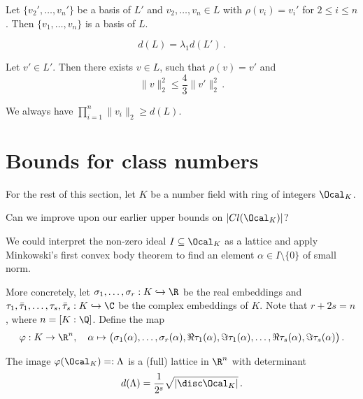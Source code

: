 \begin{lem}
	Let \( \{v_2', \dotsc, v_n'\} \) be a basis of \( L' \) and \( v_2, \dotsc, v_n \in L \) with \( \rho(v_i) = v_i' \) for \( 2 \leq i \leq n \).
	Then \( \{v_1, \dotsc, v_n\} \) is a basis of \( L \).
\end{lem}

\begin{lem}
	\[ d(L) = \lambda_1 d(L') \,. \]
\end{lem}

\begin{lem}
	Let \( v' \in L' \).
	Then there exists \( v \in L \), such that \( \rho(v) = v' \) and
	\[ \|v\|_2^2 \leq \frac{4}{3} \|v'\|_2^2 \,. \]
\end{lem}

\begin{rem*}
	We always have \( \prod_{i=1}^{n} \|v_i\|_2 \geq d(L) \).
\end{rem*}


\section{Bounds for class numbers}

For the rest of this section, let \( K \) be a number field with ring of integers \( \Ocal_K \).

\begin{frage*}
	Can we improve upon our earlier upper bounds on \( |Cl(\Ocal_K)| \)?
\end{frage*}

\begin{idee*}
	We could interpret the non-zero ideal \( I \subseteq \Ocal_K \) as a lattice and apply Minkowski's first convex body theorem to find an element \( \alpha \in I \setminus \{0\} \) of small norm.
\end{idee*}

More concretely, let \( \sigma_1, \dotsc, \sigma_r: K \hookrightarrow \R \) be the real embeddings and \( \tau_1, \bar{\tau}_1, \dotsc, \tau_s, \bar{\tau}_s: K \hookrightarrow \C \) be the complex embeddings of \( K \).
Note that \( r + 2s = n \), where \( n = [K:\Q] \).
Define the map 
\[ \varphi: K \to \R^n,\quad \alpha \mapsto \big( \sigma_1(\alpha), \dotsc, \sigma_r(\alpha), \Re \tau_1(\alpha), \Im \tau_1(\alpha), \dotsc, \Re \tau_s(\alpha), \Im \tau_s(\alpha) \big) \,. \]

\begin{lem}
	The image \( \varphi(\Ocal_K) =: \Lambda \) is a (full) lattice in \( \R^n \) with determinant
	\[ d(\Lambda) = \frac{1}{2^s} \sqrt{|\disc \Ocal_K|} \,. \]
\end{lem}

